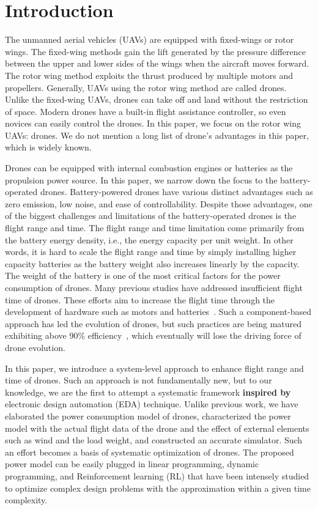 \documentclass[journal]{./template/IEEEtran}
\begin{document}
\section{Introduction}
\label{Section: introduction}
The unmanned aerial vehicles (UAVs) are equipped with fixed-wings or rotor wings. 
The fixed-wing methods gain the lift generated by the pressure difference between the upper and lower sides of the wings when the aircraft moves forward. 
The rotor wing method exploits the thrust produced by multiple motors and propellers. Generally, UAVs using the rotor wing method are called drones. 
Unlike the fixed-wing UAVs, drones can take off and land without the restriction of space. 
Modern drones have a built-in flight assistance controller, so even novices can easily control the drones. 
In this paper, we focus on the rotor wing UAVs: drones. We do not mention a long list of drone's advantages in this paper, which is widely known. 

Drones can be equipped with internal combustion engines or batteries as the propulsion power source. In this paper, we narrow down the focus to the battery-operated drones.
Battery-powered drones have various distinct advantages such as zero emission, low noise, and ease of controllability.
Despite those advantages, one of the biggest challenges and limitations of the battery-operated drones is the flight range and time. 
The flight range and time limitation come primarily from the battery energy density, i.e., the energy capacity per unit weight.
In other words, it is hard to scale the flight range and time by simply installing higher capacity batteries as the battery weight also increases linearly by the capacity. 
The weight of the battery is one of the most critical factors for the power consumption of drones. 
Many previous studies have addressed insufficient flight time of drones. 
These efforts aim to increase the flight time through the development of hardware such as motors and batteries~\cite{ref_1}.
Such a component-based approach has led the evolution of drones, but such practices are being matured exhibiting above 90\% efficiency~\cite{ref_2}, which eventually will lose the driving force of drone evolution. 

In this paper, we introduce a system-level approach to enhance flight range and time of drones.
Such an approach is not fundamentally new, but to our knowledge, we are the first to attempt a systematic framework \textbf{inspired by} electronic design automation (EDA) technique.
Unlike previous work, we have elaborated the power consumption model of drones, characterized the power model with the actual flight data of the drone and the effect of external elements such as wind and the load weight, and constructed an accurate simulator.
Such an effort becomes a basis of systematic optimization of drones.
The proposed power model can be easily plugged in linear programming, dynamic programming, and Reinforcement learning (RL) that have been intensely studied to optimize complex design problems with the approximation within a given time complexity.
\end{document}
